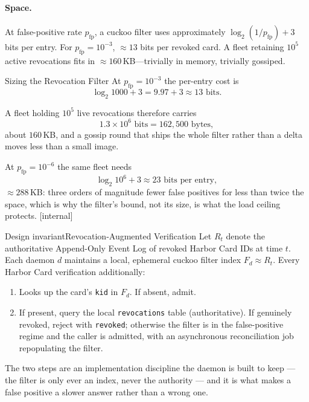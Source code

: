 \documentclass[11pt,a4paper]{article}
\theoremstyle{definition}
\begin{document}
\paragraph{Space.} At false-positive rate $p_{\mathrm{fp}}$, a cuckoo filter uses approximately $\log_2(1/p_{\mathrm{fp}}) + 3$ bits per entry. For $p_{\mathrm{fp}} = 10^{-3}$, $\approx 13$ bits per revoked card. A fleet retaining $10^{5}$ active revocations fits in $\approx 160$\,KB---trivially in memory, trivially gossiped.

\begin{pdexample}{Sizing the Revocation Filter}
\setlength{\parskip}{4pt plus 1pt}
At $p_{\mathrm{fp}} = 10^{-3}$ the per-entry cost is
\[
\log_2 1000 + 3 = 9.97 + 3 \approx 13 \text{ bits}.
\]

A fleet holding $10^{5}$ live revocations therefore carries
\[
1.3 \times 10^{6} \text{ bits} = 162{,}500 \text{ bytes},
\]
about $160$\,KB, and a gossip round
that ships the whole filter rather than a delta moves less than a small image.

At
$p_{\mathrm{fp}} = 10^{-6}$ the same fleet needs
\[
\log_2 10^{6} + 3 \approx 23 \text{ bits per entry},
\]
$\approx 288$\,KB: three orders of magnitude fewer false positives
for less than twice the space, which is why the filter's bound, not its size, is
what the load ceiling protects. [internal]
\end{pdexample}

\begin{pdclaim}{Design invariant}{Revocation-Augmented Verification}
\setlength{\parskip}{4pt plus 1pt}
\label{def:revocation}
Let $R_t$ denote the authoritative Append-Only Event Log of revoked Harbor Card IDs at time $t$. Each daemon $d$ maintains a local, ephemeral cuckoo filter index $F_d \approx R_t$. Every Harbor Card verification additionally:
\begin{enumerate}[nosep]
  \item Looks up the card's \texttt{kid} in $F_d$. If absent, admit.
  \item If present, query the local \texttt{revocations} table (authoritative). If genuinely revoked, reject with \texttt{revoked}; otherwise the \mbox{filter} is in the false-positive regime and the caller is admitted, with an asynchronous reconciliation job repopulating the filter.
\end{enumerate}

The two steps are an implementation discipline the daemon is built to keep --- the filter is only ever an index, never the authority --- and it is what makes a false positive a slower answer rather than a wrong one.
\end{pdclaim}
\end{document}
